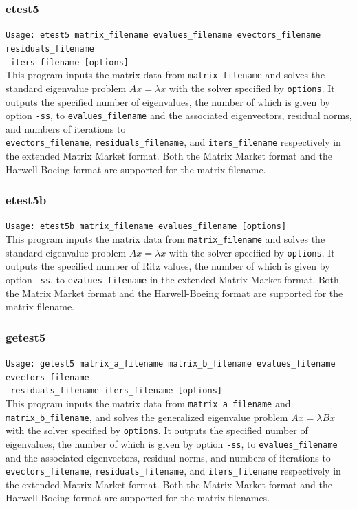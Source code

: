 \documentclass[a4paper]{article}
\begin{document}
\subsubsection{etest5}

\verb+Usage: etest5 matrix_filename evalues_filename evectors_filename residuals_filename +\\
\verb+ iters_filename [options] +\\

This program inputs the matrix data from {\tt matrix\_filename} and
solves the standard eigenvalue problem $Ax=\lambda x$ with
the solver specified by {\tt options}. 
It outputs the specified number of eigenvalues,
the number of which is given by option \verb|-ss|, to 
{\tt evalues\_filename} and the associated 
eigenvectors, residual norms, and numbers of iterations  
to \\ {\tt evectors\_filename}, {\tt residuals\_filename}, 
and {\tt iters\_filename} respectively in the extended 
Matrix Market format.
Both the Matrix Market format and the Harwell-Boeing format are
supported for the matrix filename. 

\subsubsection{etest5b}

\verb+Usage: etest5b matrix_filename evalues_filename [options] +\\

This program inputs the matrix data from {\tt matrix\_filename} and
solves the standard eigenvalue problem $Ax=\lambda x$ with
the solver specified by {\tt options}. 
It outputs the specified number of Ritz values,
the number of which is given by option \verb|-ss|, to 
{\tt evalues\_filename} in the extended 
Matrix Market format.
Both the Matrix Market format and the Harwell-Boeing format are
supported for the matrix filename. 

\subsubsection{getest5}

\verb+Usage: getest5 matrix_a_filename matrix_b_filename evalues_filename evectors_filename +\\
\verb+ residuals_filename iters_filename [options] +\\

This program inputs the matrix data from {\tt matrix\_a\_filename} and
{\tt matrix\_b\_filename}, and solves the generalized eigenvalue problem
$Ax=\lambda Bx$ with the solver specified by {\tt options}. 
It outputs the specified number of eigenvalues,
the number of which is given by option \verb|-ss|, to 
{\tt evalues\_filename} and the associated 
eigenvectors, residual norms, and numbers of iterations  
to \\ {\tt evectors\_filename}, {\tt residuals\_filename}, 
and {\tt iters\_filename} respectively in the extended 
Matrix Market format.  
Both the Matrix Market format and the Harwell-Boeing format are
supported for the matrix filenames. 
\end{document}
